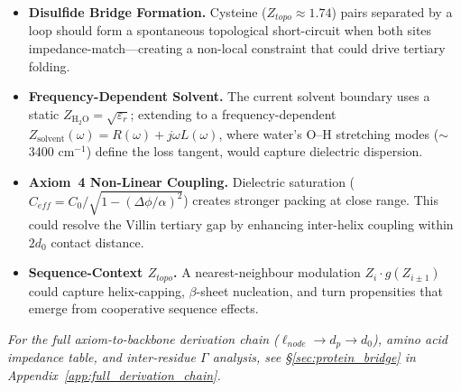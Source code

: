 \begin{itemize}
    \item \textbf{Disulfide Bridge Formation.} Cysteine ($Z_{topo} \approx 1.74$) pairs separated by a loop should form a spontaneous topological short-circuit when both sites impedance-match---creating a non-local constraint that could drive tertiary folding.
    \item \textbf{Frequency-Dependent Solvent.} The current solvent boundary uses a static $Z_{\text{H}_2\text{O}} = \sqrt{\varepsilon_r}$; extending to a frequency-dependent $Z_{\text{solvent}}(\omega) = R(\omega) + j\omega L(\omega)$, where water's O--H stretching modes ($\sim$3400 cm$^{-1}$) define the loss tangent, would capture dielectric dispersion.
    \item \textbf{Axiom~4 Non-Linear Coupling.} Dielectric saturation ($C_{eff} = C_0/\sqrt{1-(\Delta\phi/\alpha)^2}$) creates stronger packing at close range. This could resolve the Villin tertiary gap by enhancing inter-helix coupling within $2d_0$ contact distance.
    \item \textbf{Sequence-Context $Z_{topo}$.} A nearest-neighbour modulation $Z_i \cdot g(Z_{i\pm1})$ could capture helix-capping, $\beta$-sheet nucleation, and turn propensities that emerge from cooperative sequence effects.
\end{itemize}

\medskip\noindent
\textit{For the full axiom-to-backbone derivation chain
($\ell_{node} \to d_p \to d_0$), amino acid impedance table, and
inter-residue $\Gamma$ analysis, see \S\ref{sec:protein_bridge} in
Appendix~\ref{app:full_derivation_chain}.}
